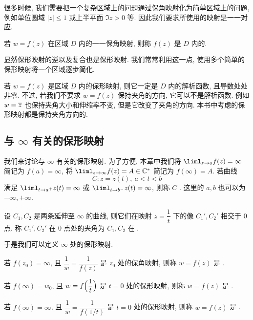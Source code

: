 很多时候, 我们需要把一个复杂区域上的问题通过保角映射化为简单区域上的问题, 例如单位圆域 $|z|\le1$ 或上半平面 $\Im z>0$ 等.
因此我们要求所使用的映射是一一对应.

\begin{definition}
  若 $w=f(z)$ 在区域 $D$ 内的一一保角映射, 则称 $f(z)$ 是 $D$ 内的.\footnotemark
\end{definition}

显然保形映射的逆以及复合也是保形映射.
我们常常利用这一点, 使用多个简单的保形映射将一个区域逐步简化.

若 $w=f(z)$ 是区域 $D$ 内的保形映射, 则它一定是 $D$ 内的解析函数, 且导数处处非零.
不过, 若我们不要求 $w=f(z)$ 保持夹角的方向, 它可以不是解析函数.
例如 $w=\overline z$ 也保持夹角大小和伸缩率不变, 但是它改变了夹角的方向.
\alert{本书中考虑的保形映射都是保持夹角方向的}.


\subsection{与 \texorpdfstring{$\infty$}{∞} 有关的保形映射}

我们来讨论与 $\infty$ 有关的保形映射.
为了方便, 本章中我们将 $\liml_{z\ra a}f(z)=\infty$ 简记为 $f(a)=\infty$, 将 $\liml_{z\ra \infty}f(z)=A\in\BC^*$ 简记为 $f(\infty)=A$.
若曲线
\[
  C: z=z(t),\ a<t<b
\]
满足 $\liml_{t\ra a^+}z(t)=\infty$ 或 $\liml_{t\ra b^-}z(t)=\infty$, 则称 $C$ .
这里的 $a,b$ 也可以为 $-\infty,+\infty$.

\begin{definition}
  设 $C_1,C_2$ 是两条延伸至 $\infty$ 的曲线, 则它们在映射 $z=\dfrac1t$ 下的像 $C_1',C_2'$ 相交于 $0$ 点.
  称 $C_1',C_2'$ 在 $0$ 点处的夹角为 $C_1,C_2$ 在 .
\end{definition}

于是我们可以定义 $\infty$ 处的保形映射.
\begin{definition}
  \begin{enuma}
    \item 若 $f(z_0)=\infty$, 且 $\dfrac1w=\dfrac1{f(z)}$ 是 $z_0$ 处的保角映射, 则称 $w=f(z)$ 是 .
    \item 若 $f(\infty)=w_0$, 且 $w=f\Bigl(\dfrac1t\Bigr)$ 是 $t=0$ 处的保形映射, 则称 $w=f(z)$ 是 .
    \item 若 $f(\infty)=\infty$, 且 $\dfrac1w=\dfrac1{f(1/t)}$ 是 $t=0$ 处的保形映射, 则称 $w=f(z)$ 是 .
  \end{enuma}
\end{definition}

